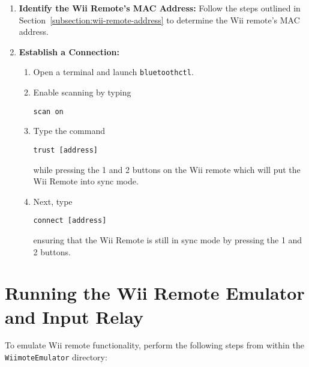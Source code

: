 \begin{enumerate}
	\item \textbf{Identify the Wii Remote's MAC Address:}
	      Follow the steps outlined in Section~\ref{subsection:wii-remote-address} to determine the Wii remote's MAC address.

	\item \textbf{Establish a Connection:}
	      \begin{enumerate}
		      \item Open a terminal and launch \texttt{bluetoothctl}.
		      \item Enable scanning by typing
		            \begin{verbatim}
scan on
\end{verbatim}
		      \item Type the command
		            \begin{verbatim}
trust [address]
        \end{verbatim}
		            while pressing the 1 and 2 buttons on the Wii remote which will put the Wii Remote into sync mode.
		      \item Next, type
		            \begin{verbatim}
connect [address]
        \end{verbatim}
		            ensuring that the Wii Remote is still in sync mode by pressing the 1 and 2 buttons.
	      \end{enumerate}
\end{enumerate}


\section{Running the Wii Remote Emulator and Input Relay}

To emulate Wii remote functionality, perform the following steps from within the \texttt{WiimoteEmulator} directory:

